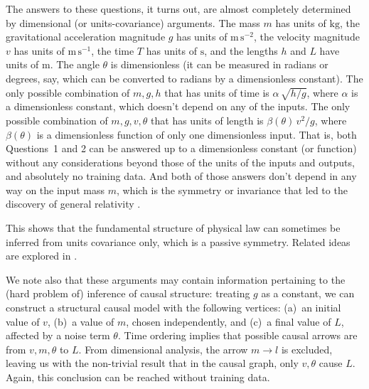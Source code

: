 \documentclass{article}
\newcommand{\unit}[1]{\mathrm{#1}}
\newcommand{\kg}{\unit{kg}}
\newcommand{\m}{\unit{m}}
\newcommand{\s}{\unit{s}}
\begin{document}
The answers to these questions, it turns out, are almost completely determined by dimensional (or units-covariance) arguments.
The mass $m$ has units of $\kg$, the gravitational acceleration magnitude $g$ has units of $\m\,\s^{-2}$, the velocity magnitude $v$ has units of $\m\,\s^{-1}$, the time $T$ has units of $\s$, and the lengths $h$ and $L$ have units of $\m$.
The angle $\theta$ is dimensionless (it can be measured in radians or degrees, say, which can be converted to radians by a dimensionless constant).
The only possible combination of $m, g, h$ that has units of time is $\alpha\,\sqrt{h/g}$, where $\alpha$ is a dimensionless constant, which doesn't depend on any of the inputs.
The only possible combination of $m, g, v, \theta$ that has units of length is $\beta(\theta)\,v^2/g$, where $\beta(\theta)$ is a dimensionless function of only one dimensionless input.
That is, both Questions~1 and 2 can be answered up to a dimensionless constant (or function) without any considerations beyond those of the units of the inputs and outputs, and absolutely no training data.
And both of those answers don't depend in any way on the input mass $m$, which is the symmetry or invariance that led to the discovery of general relativity \cite{gr}.

This shows that the fundamental structure of physical law can sometimes be inferred from units covariance only, which is a passive symmetry.  Related ideas are explored in \cite{villar2022dimensionless}.

We note also that these arguments may contain information pertaining to the (hard problem of) inference of causal structure:
treating $g$ as a constant, we can construct a structural causal model with the following vertices: (a)~an initial value of $v$, (b)~a value of $m$, chosen independently, and (c)~a final value of $L$, affected by a noise term $\theta$.
Time ordering implies that possible causal arrows are from $v, m, \theta$ to $L$.
From dimensional analysis, the arrow $m\to l$ is excluded, leaving us with the non-trivial result that in the causal graph, only $v,\theta$ cause $L$.
Again, this conclusion can be reached without training data.
\end{document}
